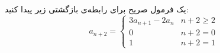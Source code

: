 	\p
	یک فرمول صریح برای رابطه‌ی بازگشتی زیر پیدا کنید:
  \begin{equation}
  a_{n+2} =
    \begin{cases}
      3a_{n+1} - 2a_n  & n + 2 \geq 2\\
      0 & n + 2 = 0\\
      1 & n + 2 = 1
    \end{cases}       
\end{equation}